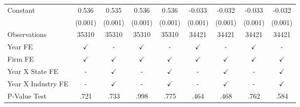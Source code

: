 {\begin{tabular}{l*{8}{c}}
Constant            &       0.536\sym{***}&       0.535\sym{***}&       0.536\sym{***}&       0.536\sym{***}&      -0.033\sym{***}&      -0.032\sym{***}&      -0.033\sym{***}&      -0.032\sym{***}\\
                    &     (0.001)         &     (0.001)         &     (0.001)         &     (0.001)         &     (0.001)         &     (0.001)         &     (0.001)         &     (0.001)         \\
\midrule
Observations        &       35310         &       35310         &       35310         &       35310         &       34421         &       34421         &       34421         &       34421         \\
Year FE             &$\checkmark$         &           -         &$\checkmark$         &           -         &$\checkmark$         &           -         &$\checkmark$         &           -         \\
Firm FE             &$\checkmark$         &$\checkmark$         &$\checkmark$         &$\checkmark$         &$\checkmark$         &$\checkmark$         &$\checkmark$         &$\checkmark$         \\
Year X State FE     &           -         &$\checkmark$         &           -         &$\checkmark$         &           -         &$\checkmark$         &           -         &$\checkmark$         \\
Year X Industry FE  &           -         &$\checkmark$         &           -         &$\checkmark$         &           -         &$\checkmark$         &           -         &$\checkmark$         \\
P-Value Test        &        .721         &        .733         &        .998         &        .775         &        .464         &        .468         &        .762         &        .584         \\
\bottomrule
\end{tabular}
}
